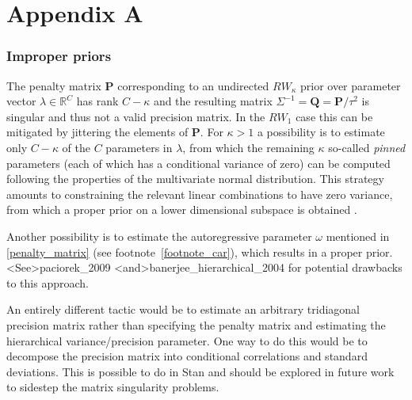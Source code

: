 

\chapter*{Appendix A}\label{AppendixA}

\vspace{-1.75cm}
\subsection*{Improper priors}

The penalty matrix $\mathbf{P}$ corresponding to an undirected $RW_\kappa$ prior over 
parameter vector $\lambda \in \mathbb{R}^C$ has rank $C - \kappa$ and the resulting 
matrix $\Sigma^{-1} = \mathbf{Q} = \mathbf{P}/\tau^2$ is singular and thus not a valid precision 
matrix. In the $RW_1$ case this can be mitigated by jittering the elements of $\mathbf{P}$. 
For $\kappa > 1$ a possibility is to estimate only $C - \kappa$ of the $C$ parameters in $\lambda$,  
from which the remaining $\kappa$ so-called {\it pinned} parameters (each of which has a 
conditional variance of zero) can be computed following the properties of the multivariate 
normal distribution. This strategy amounts to  constraining the relevant linear combinations 
to have zero variance, from which a proper prior on a lower dimensional subspace is 
obtained . 

Another possibility is to estimate the autoregressive parameter $\omega$ mentioned 
in \ref{penalty_matrix} (see footnote~\ref{footnote_car}), which results in a proper prior.
\citeA<See>{paciorek_2009} \citeA<and>{banerjee_hierarchical_2004} for potential
drawbacks to this approach.

An entirely different tactic would be to estimate an arbitrary tridiagonal precision matrix 
rather than specifying the penalty matrix and estimating the hierarchical variance/precision 
parameter. One way to do this would be to decompose the precision matrix into conditional 
correlations and standard deviations. This is possible to do in Stan and should be explored 
in future work to sidestep the matrix singularity problems. 


